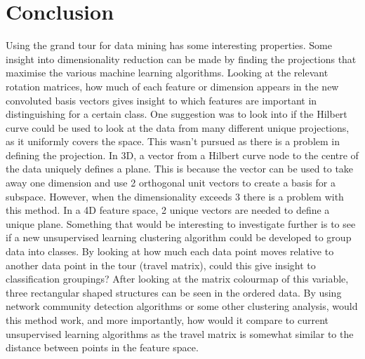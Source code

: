\documentclass[a4paper,11pt,twoside]{article}
\begin{document}
\newpage
\section{Conclusion}

Using the grand tour for data mining has some interesting properties. Some insight into dimensionality reduction can be made by finding the projections that maximise the various machine learning algorithms. Looking at the relevant rotation matrices, how much of each feature or dimension appears in the new convoluted basis vectors gives insight to which features are important in distinguishing for a certain class.
\newline
\newline
One suggestion was to look into if the Hilbert curve could be used to look at the data from many different unique projections, as it uniformly covers the space. This wasn’t pursued as there is a problem in defining the projection. In 3D, a vector from a Hilbert curve node to the centre of the data uniquely defines a plane. This is because the vector can be used to take away one dimension and use 2 orthogonal unit vectors to create a basis for a subspace. However, when the dimensionality exceeds 3 there is a problem with this method. In a 4D feature space, 2 unique vectors are needed to define a unique plane. 
\newline
\newline
Something that would be interesting to investigate further is to see if a new unsupervised learning clustering algorithm could be developed to group data into classes. By looking at how much each data point moves relative to another data point in the tour (travel matrix), could this give insight to classification groupings? After looking at the matrix colourmap of this variable, three rectangular shaped structures can be seen in the ordered data. By using network community detection algorithms or some other clustering analysis, would this method work, and more importantly, how would it compare to current unsupervised learning algorithms as the travel matrix is somewhat similar to the distance between points in the feature space.
\end{document}
